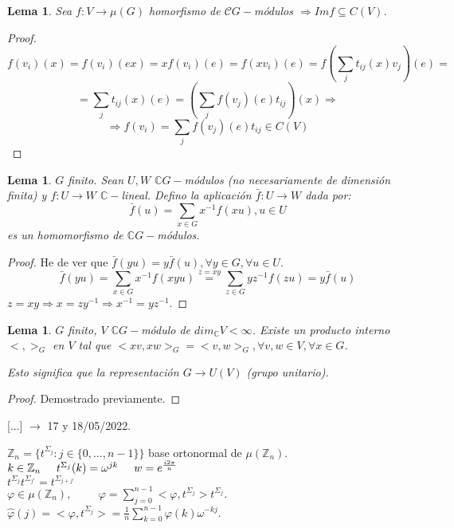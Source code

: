 \documentclass[11pt,a4paper]{article}
\theoremstyle{break}
\newtheorem{lemma}[theorem]{Lema}
\begin{document}
\begin{lemma}
Sea $f: V \to \mu(G)$ homorfismo de $\mathcal{C}G-$módulos $\Rightarrow Im f \subseteq C(V)$.
\end{lemma}

\begin{proof}
$$f(v_{i})(x) = f(v_{i})(ex) = x f(v_{i})(e) = f(xv_{i})(e) = f(\sum_{j}t_{ij}(x)v_{j})(e) =$$
$$= \sum_{j} t_{ij}(x)(e) = (\sum_{j} f(v_{j})(e)t_{ij})(x) \Rightarrow$$
$$\Rightarrow f(v_{i}) = \sum_{j} f(v_{j})(e)t_{ij} \in C(V)$$
\end{proof}

\begin{lemma}
$G$ finito. Sean $U, W$ $\mathbb{C}G-$módulos (no necesariamente de dimensión finita) y $f:U \to W$ $\mathbb{C}-$lineal. Defino la aplicación $\bar{f}: U \to W$ dada por:
$$\bar{f}(u) = \sum_{x \in G} x^{-1} f(xu), u \in U$$
es un homomorfismo de $\mathbb{C}G-$módulos.
\end{lemma}

\begin{proof}
He de ver que $\bar{f}(yu) = y\bar{f}(u), \forall y \in G, \forall u \in U$.
$$\bar{f}(yu) = \sum_{x \in G} x^{-1} f(xyu) \overset{z = xy}{=} \sum_{z \in G} yz^{-1} f(zu) = y \bar{f}(u)$$
$z = xy \Rightarrow x = zy^{-1} \Rightarrow x^{-1} = yz^{-1}$.
\end{proof}

\begin{lemma}
$G$ finito, $V$ $\mathbb{C}G-$módulo de $dim_{\mathbb{C}}V < \infty$. Existe un producto interno $<, >_{G}$ en $V$ tal que $<xv, xw>_{G} = <v, w>_{G}, \forall v, w \in V, \forall x \in G$.

Esto significa que la representación $G \to U(V)$ (grupo unitario).
\end{lemma}

\begin{proof}
Demostrado previamente.
\end{proof}

[...] $\to$ 17 y 18/05/2022.


$\mathbb{Z}_{n} = \{t^{\Sigma_{j}}: j \in \{0, \dots, n-1\}\}$ base ortonormal de $\mu(\mathbb{Z}_{n})$. \\
$k \in \mathbb{Z}_{n} \hspace{0.5cm} t^{\Sigma_{j}}(k) = \omega^{jk} \hspace{0.5cm} w = e^{\frac{i2\pi}{n}}$ \\
$t^{\Sigma_{j}}t^{\Sigma_{j'}} = t^{\Sigma_{j+j'}}$ \\
$\varphi \in \mu(\mathbb{Z}_{n}), \hspace{1cm} \varphi = \sum_{j=0}^{n-1} <\varphi, t^{\Sigma_{j}}> t^{\Sigma_{j}}$. \\
$\hat{\varphi}(j) = <\varphi, t^{\Sigma_{j}}> = \frac{1}{n} \sum_{k=0}^{n-1} \varphi(k) \omega^{-kj}$.
\end{document}

